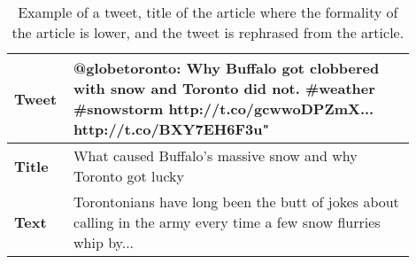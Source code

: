 \begin{table}[!t]
\centering
\begin{tabular}{|p{0.1\linewidth}|p{0.8\linewidth}|}
\hline
\textbf{Tweet} &  @globetoronto: Why Buffalo got clobbered with snow and Toronto did not. \#weather \#snowstorm http://t.co/gcwwoDPZmX... http://t.co/BXY7EH6F3u" \\ \hline
\textbf{Title} & What caused Buffalo’s massive snow and why Toronto got lucky \\  \hline
\textbf{Text}  & Torontonians have long been the butt of jokes about calling in the army every time a few snow flurries whip by... \\ \hline
\end{tabular}
\caption[Example of formality in article affecting tweet]{Example of a tweet, title of the article where the formality of the article is lower, and the tweet is rephrased from the article.}
\label{tab:formalexample}
\end{table}

